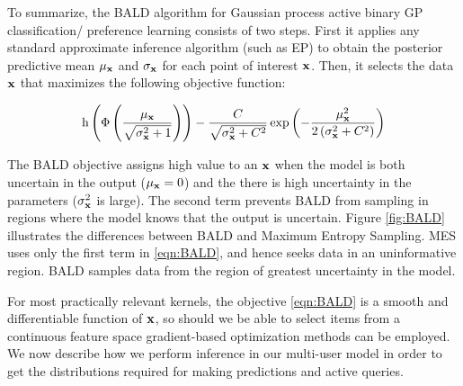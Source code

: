 To summarize, the BALD algorithm for Gaussian process active binary GP classification/ preference learning consists of two steps. First it applies any standard approximate inference algorithm (such as EP) to obtain the posterior predictive mean $\mu_{\mathbf{x}}$ and $\sigma_{\mathbf{x}}$ for each point of interest $\mathbf{x}$. Then, it selects the data $\mathbf{x}$ that maximizes the following objective function:

\begin{equation}
        \mathrm{h} \left( \Phi\left( \frac{\mu_{\mathbf{x}}}{\sqrt{\sigma^2_{\mathbf{x}} + 1}} \right)\right) - \frac{C}{\sqrt{\sigma_{\mathbf{x}}^2 + C^2}} \exp\left(-\frac{\mu_{\mathbf{x}}^2}{2\left(\sigma_{\mathbf{x}}^2 + C^2\right)}\right) \label{eqn:BALD}
\end{equation}

The BALD objective assigns high value to an $\mathbf{x}$ when the model is both uncertain in
the output ($\mu_{\mathbf{x}}=0$) and the there is high uncertainty in the parameters
($\sigma_{\mathbf{x}}^2$ is large). The second term prevents BALD from sampling in regions
where the model knows that the output is uncertain. Figure \ref{fig:BALD} illustrates
the differences between BALD and Maximum Entropy Sampling.
MES uses only the first term in \eqref{eqn:BALD}, and hence seeks data in an
uninformative region. BALD samples data from the region of greatest uncertainty in the model.

For most practically relevant kernels, the objective \eqref{eqn:BALD} is a smooth and differentiable function of $\mathbf{x}$, so should we be able to select items from a continuous feature space gradient-based optimization methods can be employed. We now describe how we perform inference in our multi-user model in order to get the distributions required for making predictions and active queries. 

